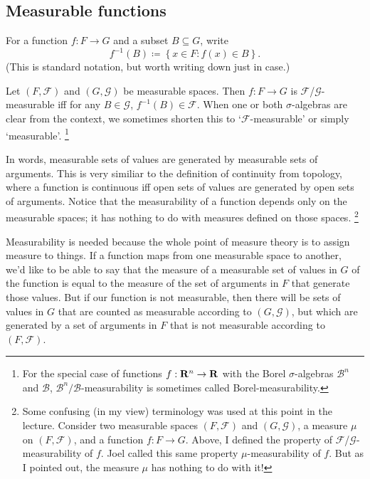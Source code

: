 \documentclass[11pt,letterpaper,reqno,oneside]{article}
\begin{document}
\subsection{Measurable functions}
\label{sec:probability:measurable_functions}

For a function $f : F \to G$ and a subset $B \subseteq G$, write
%
\begin{equation*}
	f^{-1}(B)
	\coloneqq \left\{ x \in F : f(x) \in B \right\} .
\end{equation*}
%
(This is standard notation, but worth writing down just in case.)

\begin{definition}
	Let $(F,\mathcal{F})$ and $(G,\mathcal{G})$ be measurable spaces. Then $f : F \to G$ is $\mathcal{F}$/$\mathcal{G}$-measurable iff for any $B \in \mathcal{G}$, $f^{-1}(B) \in \mathcal{F}$. When one or both $\sigma$-algebras are clear from the context, we sometimes shorten this to `$\mathcal{F}$-measurable' or simply `measurable'.%
		\footnote{For the special case of functions $f : \mathbf{R}^n \to \mathbf{R}$ with the Borel $\sigma$-algebras $\mathcal{B}^n$ and $\mathcal{B}$, $\mathcal{B}^n/\mathcal{B}$-measurability is sometimes called Borel-measurability.}
\end{definition}

In words, measurable sets of values are generated by measurable sets of arguments. This is very similiar to the definition of continuity from topology, where a function is continuous iff open sets of values are generated by open sets of arguments. Notice that the measurability of a function depends only on the measurable spaces; it has nothing to do with measures defined on those spaces.%
	\footnote{Some confusing (in my view) terminology was used at this point in the lecture. Consider two measurable spaces $(F,\mathcal{F})$ and $(G,\mathcal{G})$, a measure $\mu$ on $(F,\mathcal{F})$, and a function $f : F \to G$. Above, I defined the property of $\mathcal{F}$/$\mathcal{G}$-measurability of $f$. Joel called this same property $\mu$-measurability of $f$. But as I pointed out, the measure $\mu$ has nothing to do with it!}

Measurability is needed because the whole point of measure theory is to assign measure to things. If a function maps from one measurable space to another, we'd like to be able to say that the measure of a measurable set of values in $G$ of the function is equal to the measure of the set of arguments in $F$ that generate those values. But if our function is not measurable, then there will be sets of values in $G$ that are counted as measurable according to $(G,\mathcal{G})$, but which are generated by a set of arguments in $F$ that is not measurable according to $(F,\mathcal{F})$.
\end{document}
